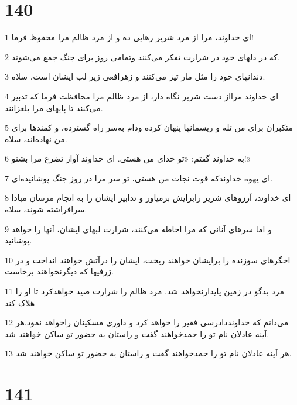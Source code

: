 \chapter{140}

\par 1 ای خداوند، مرا از مرد شریر رهایی ده و از مرد ظالم مرا محفوظ فرما!
\par 2 که در دلهای خود در شرارت تفکر می‌کنند وتمامی روز برای جنگ جمع می‌شوند.
\par 3 دندانهای خود را مثل مار تیز می‌کنند و زهرافعی زیر لب ایشان است، سلاه.
\par 4 ‌ای خداوند مرااز دست شریر نگاه دار، از مرد ظالم مرا محافظت فرما که تدبیر می‌کنند تا پایهای مرا بلغزانند.
\par 5 متکبران برای من تله و ریسمانها پنهان کرده ودام به‌سر راه گسترده، و کمندها برای من نهاده‌اند، سلاه.
\par 6 به خداوند گفتم: «تو خدای من هستی. ای خداوند آواز تضرع مرا بشنو!»
\par 7 ‌ای یهوه خداوندکه قوت نجات من هستی، تو سر مرا در روز جنگ پوشانیده‌ای.
\par 8 ‌ای خداوند، آرزوهای شریر رابرایش برمیاور و تدابیر ایشان را به انجام مرسان مبادا سرافراشته شوند، سلاه.
\par 9 و اما سرهای آنانی که مرا احاطه می‌کنند، شرارت لبهای ایشان، آنها را خواهد پوشانید.
\par 10 اخگرهای سوزنده را برایشان خواهند ریخت، ایشان را درآتش خواهند انداخت و در ژرفیها که دیگرنخواهند برخاست.
\par 11 مرد بدگو در زمین پایدارنخواهد شد. مرد ظالم را شرارت صید خواهدکرد تا او را هلاک کند
\par 12 می‌دانم که خداونددادرسی فقیر را خواهد کرد و داوری مسکینان راخواهد نمود.هر آینه عادلان نام تو را حمدخواهند گفت و راستان به حضور تو ساکن خواهند شد.
\par 13 هر آینه عادلان نام تو را حمدخواهند گفت و راستان به حضور تو ساکن خواهند شد.
 
\chapter{141}

